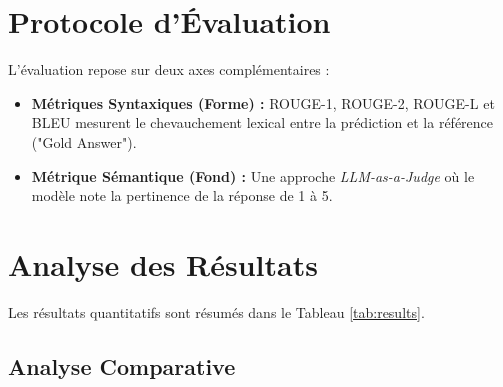 \documentclass[a4paper,11pt]{article}
\begin{document}
\section{Protocole d'Évaluation}

L'évaluation repose sur deux axes complémentaires :
\begin{itemize}
    \item \textbf{Métriques Syntaxiques (Forme) :} ROUGE-1, ROUGE-2, ROUGE-L et BLEU mesurent le chevauchement lexical entre la prédiction et la référence ("Gold Answer").
    \item \textbf{Métrique Sémantique (Fond) :} Une approche \textit{LLM-as-a-Judge} où le modèle note la pertinence de la réponse de 1 à 5.
\end{itemize}

\section{Analyse des Résultats}

Les résultats quantitatifs sont résumés dans le Tableau \ref{tab:results}.

\begin{table}[H]
    \centering
    \caption{Comparaison des performances des 5 stratégies (Moyennes sur le set de test)}
    \label{tab:results}
\end{table}

\subsection{Analyse Comparative}
\end{document}
